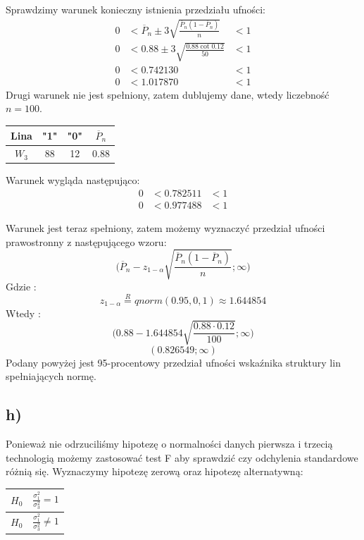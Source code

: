 \documentclass{article}
\begin{document}
Sprawdzimy warunek konieczny istnienia przedziału ufności:
\[ \begin{array}{ccc}
0 & < \overline{P}_n \pm 3 \sqrt{ \frac{\overline{P}_n ( 1 - \overline{P}_n)}{n} } & < 1 \\
0 & < 0.88 \pm 3 \sqrt{ \frac{0.88 \cot 0.12}{50}} & < 1 \\ \hline
0  &< 0.742130 & < 1 \\ 
0 & < 1.017870 & < 1
\end{array} \]
Drugi warunek nie jest spełniony, zatem dublujemy dane, wtedy liczebność $n = 100$.
\begin{center} \begin{tabular}{|c|c|c|c|} \hline
Lina & "1" & "0" & $\overline{P}_n$ \\ \hline
$W_3$ & 88 & 12 & 0.88 \\ \hline
\end{tabular} \end{center}

Warunek wygląda następująco:
\[ \begin{array}{ccc}
0 & < 0.782511 & < 1 \\
0 & < 0.977488 & < 1
\end{array} \]

Warunek jest teraz spełniony, zatem możemy wyznaczyć przedział ufności prawostronny z następującego wzoru:
\[ \Big( \overline{P}_n - z_{1 - \alpha} \sqrt{ \frac{\overline{P}_n(1 - \overline{P}_n)}{n} } ; \infty \Big) \]
Gdzie : 
\[ z_{1 - \alpha} \overset{R}{=} qnorm(0.95, 0, 1) \approx 1.644854 \]
Wtedy :
\[ \Big( 0.88 - 1.644854 \sqrt{ \frac{0.88 \cdot 0.12}{100} } ; \infty \Big) \]
\[ ( 0.826549 ; \infty ) \]
Podany powyżej jest 95-procentowy przedział ufności wskaźnika struktury lin spełniających normę.

\subsection{h)}
Ponieważ nie odrzuciliśmy hipotezę o normalności danych pierwsza i trzecią technologią możemy zastosować test F aby sprawdzić czy odchylenia standardowe różnią się. Wyznaczymy hipotezę zerową oraz hipotezę alternatywną:
\begin{center} \begin{tabular}{|c|c|} \hline
$H_0$ & $\frac{\sigma^2_1}{\sigma^2_3} = 1$ \\ \hline
$H_0$ & $\frac{\sigma^2_1}{\sigma^2_3} \neq 1$ \\ \hline
\end{tabular} \end{center}
\end{document}
